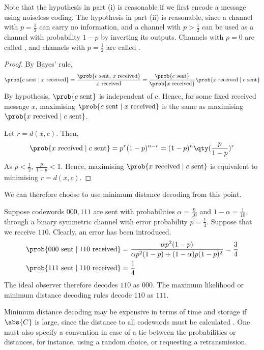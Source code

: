Note that the hypothesis in part (i) is reasonable if we first encode a message using noiseless coding.
The hypothesis in part (ii) is reasonable, since a channel with $p = \frac{1}{2}$ can carry no information, and a channel with $p > \frac{1}{2}$ can be used as a channel with probability $1 - p$ by inverting its outputs.
Channels with $p = 0$ are called , and channels with $p = \frac{1}{2}$ are called .
\begin{proof}
    By Bayes' rule,
    \begin{align*}
        \prob{c \text{ sent} \mid x \text{ received}} = \frac{\prob{c \text{ sent, } x \text{ received}}}{x \text{ received}} = \frac{\prob{c \text{ sent}}}{\prob{x \text{ received}}} \prob{x \text{ received} \mid c \text{ sent}}
    \end{align*}
    By hypothesis, $\prob{c \text{ sent}}$ is independent of $c$.
    Hence, for some fixed received message $x$, maximising $\prob{c \text{ sent} \mid x \text{ received}}$ is the same as maximising $\prob{x \text{ received} \mid c \text{ sent}}$.

    Let $r = d(x,c)$.
    Then,
    \begin{align*}
        \prob{x \text{ received} \mid c \text{ sent}} = p^r (1-p)^{n-r} = (1-p)^n \qty(\frac{p}{1-p})^r
    \end{align*}
    As $p < \frac{1}{2}$, $\frac{p}{1-p} < 1$.
    Hence, maximising $\prob{x \text{ received} \mid c \text{ sent}}$ is equivalent to minimising $r = d(x,c)$.
\end{proof}
We can therefore choose to use minimum distance decoding from this point.
\begin{example}
    Suppose codewords $000, 111$ are sent with probabilities $\alpha = \frac{9}{10}$ and $1 - \alpha = \frac{1}{10}$, through a binary symmetric channel with error probability $p = \frac{1}{4}$.
    Suppose that we receive $110$.
    Clearly, an error has been introduced.
    \begin{align*}
        \prob{000 \text{ sent} \mid 110 \text{ received}} &= \frac{\alpha p^2 (1-p)}{\alpha p^2 (1-p) + (1-\alpha)p(1-p)^2} = \frac{3}{4} \\
        \prob{111 \text{ sent} \mid 110 \text{ received}} &= \frac{1}{4}
    \end{align*}
    The ideal observer therefore decodes $110$ as $000$.
    The maximum likelihood or minimum distance decoding rules decode $110$ as $111$.
\end{example}
\begin{remark}
    Minimum distance decoding may be expensive in terms of time and storage if $\abs{C}$ is large, since the distance to all codewords must be calculated .
    One must also specify a convention in case of a tie between the probabilities or distances, for instance, using a random choice, or requesting a retransmission.
\end{remark}

